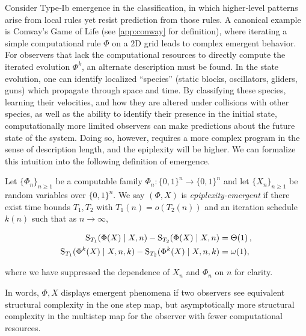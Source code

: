 \documentclass[twoside]{article}
\newcommand{\rS}{\mathrm{S}}
\begin{document}
Consider Type‐Ib emergence in the \citet{carroll2024emergence} classification, in which higher‐level patterns arise from local rules yet resist prediction from those rules. A canonical example is Conway’s Game of Life (see \autoref{app:conway} for definition), where iterating a simple computational rule $\Phi$ %
on a $2$D grid leads to complex emergent behavior. For observers that lack the computational resources to directly compute the iterated evolution $\Phi^k$, an alternate description must be found. In the state evolution, one can identify localized “species” (static blocks, oscillators, gliders, guns) which propagate through space and time. %
By classifying these species, learning their velocities, and how they are altered under collisions with other species, as well as the ability to identify their presence in the initial state, computationally more limited observers can make predictions about the future state of the system. Doing so, however, requires a more complex program in the sense of description length, and the epiplexity will be higher. We can formalize this intuition into the following definition of emergence.

\begin{remarkbox}{}
\begin{definition}
\label{def:epiemergent}
Let $\{\Phi_n\}_{n\ge1}$ be a computable family $\Phi_n:\{0,1\}^n\to\{0,1\}^n$
and let $\{X_n\}_{n\ge1}$ be random variables over $\{0,1\}^n$.
We say $(\Phi,X)$ is \emph{epiplexity-emergent} if there exist
time bounds $T_1,T_2$ with $T_1(n)=o(T_2(n))$ and an iteration schedule $k(n)$ such that as $n\to\infty$,

\begin{align}
    \rS_{T_1}(\Phi(X) \mid X,n) - \rS_{T_2}(\Phi(X) \mid X,n)&=\Theta(1)\,,\\
    \rS_{T_1}(\Phi^k(X) \mid X,n,k) -\rS_{T_2}(\Phi^k(X) \mid X,n,k) &=\omega(1), \notag
\end{align}

where we have suppressed the dependence of $X_n$ and $\Phi_n$ on $n$ for clarity.
\end{definition}
\end{remarkbox}
In words, $\Phi,X$ displays emergent phenomena if two observers see equivalent structural complexity in the one step map, but asymptotically more structural complexity in the multistep map for the observer with fewer computational resources.
\end{document}

